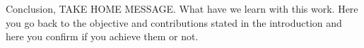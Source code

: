 \documentclass[../00_Main.tex]{subfiles}
\begin{document}
Conclusion, TAKE HOME MESSAGE.  What have we learn with this work.  Here you go back to the objective and contributions stated in the introduction and here you confirm if you achieve them or not.

\biblio %
\end{document}
